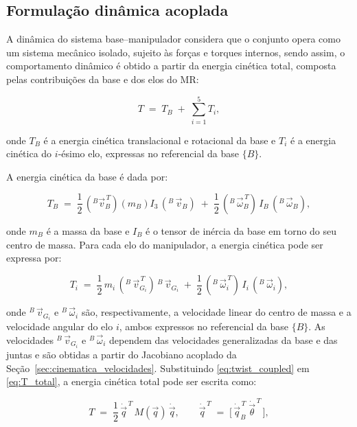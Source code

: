 \subsection{Formulação dinâmica acoplada}
\label{sec:dinamica_acoplada}

A dinâmica do sistema base--manipulador considera que o conjunto opera como um sistema mecânico isolado, sujeito às forças e torques internos, sendo assim, o comportamento dinâmico é obtido a partir da energia cinética total, composta pelas contribuições da base e dos elos do MR:

\begin{equation}
\label{eq:T_total}
T \;=\; T_{B} \;+\; \sum_{i=1}^{5} T_{i},
\end{equation}

onde $T_B$ é a energia cinética translacional e rotacional da base e $T_i$ é a energia cinética do $i$-ésimo elo, expressas no referencial da base $\{B\}$.

A energia cinética da base é dada por:

\begin{equation}
\label{eq:TB}
T_{B} \;=\;
\frac{1}{2} \, ({}^{B} \vec v_{B}^{\,T}) (m_{B}) I_{3} \, ({}^{B}\,\vec v_{B})
\;+\;
\frac{1}{2} \, ({}^{B}  \, \vec \omega_{B}^{\,T}) \, I_{B} \, ({}^{B}\,\vec \omega_{B}),
\end{equation}

onde $m_B$ é a massa da base e $I_B$ é o tensor de inércia da base em torno do seu centro de massa.
Para cada elo do manipulador, a energia cinética pode ser expressa por: 

\begin{equation}
\label{eq:Ti}
T_i \;=\;
\frac{1}{2} \, m_i \, ({}^{B} \,\vec v_{G_i}^{\,T}) \, {}^{B} \,\vec v_{G_i}
\;+\;
\frac{1}{2} \, ({}^{B} \,\vec \omega_i^{\,T}) \, I_i \, ({}^{B} \,\vec \omega_i),
\end{equation}

onde ${}^{B} \,\vec v_{G_i}$ e ${}^{B} \,\vec \omega_i$ são, respectivamente, a velocidade linear do centro de massa e a velocidade angular do elo $i$, ambos expressos no referencial da base $\{B\}$.
As velocidades ${}^{B} \,\vec v_{G_i}$ e ${}^{B} \,\vec \omega_i$ dependem das velocidades generalizadas da base e das juntas e são obtidas a partir do Jacobiano acoplado da Seção~\ref{sec:cinematica_velocidades}.
Substituindo \eqref{eq:twist_coupled} em \eqref{eq:T_total}, a energia cinética total pode ser escrita como:

\begin{equation}
\label{eq:T_matriz}
T \;=\; \frac{1}{2} \, \dot{\vec q}^{\,T} \, M(\vec q) \, \dot{\vec q},
\qquad
\dot{\vec q}^{\,T} \;=\; 
\big[\, \dot{\vec q}_{B}^{\,T} \; \dot{\vec\theta}^{\,T} \,\big],
\end{equation}

